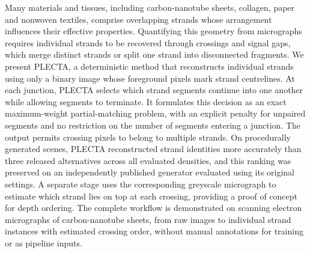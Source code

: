 Many materials and tissues, including carbon-nanotube sheets, collagen, paper
and nonwoven textiles, comprise overlapping strands whose arrangement
influences their effective properties. Quantifying this geometry from
micrographs requires individual strands to be recovered through crossings and
signal gaps, which merge distinct strands or split one strand into disconnected
fragments. We present PLECTA, a deterministic method that reconstructs
individual strands using only a binary image whose foreground pixels mark
strand centrelines. At each junction, PLECTA selects which strand segments
continue into one another while allowing segments to terminate. It formulates
this decision as an exact maximum-weight partial-matching problem, with an
explicit penalty for unpaired segments and no restriction on the number of
segments entering a junction. The output permits crossing pixels to belong to
multiple strands. On procedurally generated scenes, PLECTA reconstructed
strand identities more accurately than three released alternatives across all
evaluated densities, and this ranking was preserved on an independently
published generator evaluated using its original settings. A separate stage
uses the corresponding greyscale micrograph to estimate which strand lies on
top at each crossing, providing a proof of concept for depth ordering. The
complete workflow is demonstrated on scanning electron micrographs of
carbon-nanotube sheets, from raw images to individual strand instances with
estimated crossing order, without manual annotations for training or as
pipeline inputs.

